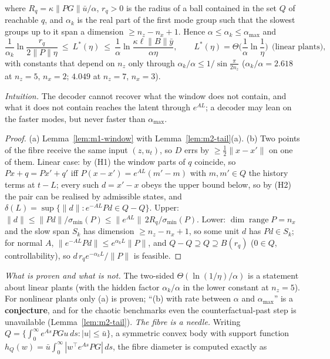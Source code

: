 \begin{theorem}
\begin{enumerate}
\[\]
where $R_q=\kappa\|PG\|\bar u/\alpha$, $r_q>0$ is the radius of a ball contained in the set $Q$ of reachable $q$,
and $\alpha_k$ is the real part of the first mode group such that the slowest groups up to it span a dimension
$\ge n_z-n_x+1$. Hence $\alpha\le\alpha_k\le\alpha_{\max}$ and
\[
 \frac1{\alpha_k}\ln\frac{r_q}{2\|P\|\eta}\ \le\ L^*(\eta)\ \le\ \frac1\alpha\ln\frac{\kappa\ell\|B\|\bar y}{\alpha\eta},
 \qquad L^*(\eta)=\Theta\!\Big(\frac1\alpha\ln\frac1\eta\Big)\ \ \text{(linear plants)},
\]
with constants that depend on $n_z$ only through $\alpha_k/\alpha\le1/\sin\frac{\pi}{2n_z}$ ($\alpha_k/\alpha=2.618$ at
$n_z=5$, $n_x=2$; $4.049$ at $n_z=7$, $n_x=3$).
\end{enumerate}
\end{theorem}
\emph{Intuition.} The decoder cannot recover what the window does not contain, and what it does not contain
reaches the latent through $e^{AL}$; a decoder may lean on the faster modes, but never faster than $\alpha_{\max}$.
\begin{proof}
(a) Lemma~\ref{lem:m1-window} with Lemma~\ref{lem:m2-tail}(a). (b) Two points of the fibre receive the same
input $(z,u_t)$, so $D$ errs by $\ge\frac12\|x-x'\|$ on one of them. Linear case: by (H1) the window parts of $q$
coincide, so $Px+q=Px'+q'$ iff $P(x-x')=e^{AL}(m'-m)$ with $m,m'\in Q$ the history terms at $t-L$; every such $d=x'-x$
obeys the upper bound below, so by (H2) the pair can be realised by admissible states, and $\delta(L)=\sup\{\|d\|:e^{-AL}Pd\in Q-Q\}$. Upper:
$\|d\|\le\|Pd\|/\sigma_{\min}(P)\le\|e^{AL}\|\,2R_q/\sigma_{\min}(P)$. Lower: $\dim\operatorname{range}P=n_x$ and
the slow span $S_k$ has dimension $\ge n_z-n_x+1$, so some unit $d$ has $Pd\in S_k$; for normal $A$,
$\|e^{-AL}Pd\|\le e^{\alpha_kL}\|P\|$, and $Q-Q\supseteq Q\supseteq B(r_q)$ ($0\in Q$, controllability), so
$d\,r_qe^{-\alpha_kL}/\|P\|$ is feasible.
\end{proof}
\emph{What is proven and what is not.} The two-sided $\Theta(\ln(1/\eta)/\alpha)$ is a statement about linear plants
(with the hidden factor $\alpha_k/\alpha$ in the lower constant at $n_z=5$). For nonlinear plants only (a) is proven;
``(b) with rate between $\alpha$ and $\alpha_{\max}$'' is a \textbf{conjecture}, and for the chaotic benchmarks even
the counterfactual-past step is unavailable (Lemma~\ref{lem:m2-tail}). \emph{The fibre is a needle.} Writing
$Q=\{\int_0^\infty e^{As}PGu\,ds:|u|\le\bar u\}$, a symmetric convex body with support function
$h_Q(w)=\bar u\int_0^\infty|w^\top e^{As}PG|\,ds$, the fibre diameter is computed exactly as
